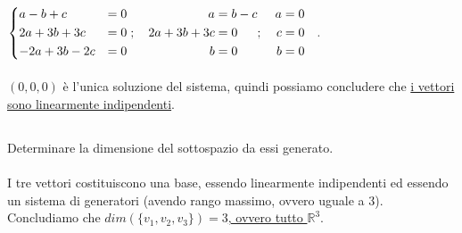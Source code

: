 \documentclass[a4paper]{report}
\newenvironment{problem}
        {
                \begin{mdframed}[topline=false,rightline=false,bottomline=false]
                        \slshape
        }
        {
                \end{mdframed}
        }
\begin{document}
        \paragraph{}
        $
                \begin{dcases}
                        a   - b  + c  & = 0 \\
                        2a  + 3b + 3c & = 0 \\
                        -2a + 3b - 2c & = 0
                \end{dcases}; \quad \begin{aligned}
                        a & = b - c \\
                        2a  + 3b + 3c & = 0 \\
                        b & = 0
                \end{aligned}; \quad \begin{aligned}
                        a & = 0 \\
                        c & = 0 \\
                        b & = 0
                \end{aligned} \quad .
        $

        \paragraph{}
        $(0,0,0)$ \`{e} l'unica soluzione del sistema, quindi possiamo concludere
        che \ul{i vettori sono linearmente indipendenti}.

        \subsection*{}
        \begin{problem}
                Determinare la dimensione del sottospazio da essi generato.
        \end{problem}

        \paragraph{}
        I tre vettori costituiscono una base, essendo linearmente indipendenti
        ed essendo un sistema di generatori (avendo rango massimo, ovvero uguale a 3).
        Concludiamo che \ul{$dim(\{v_1, v_2, v_3\}) = 3$, ovvero tutto $\mathbb{R}^3$}.


\end{document}
